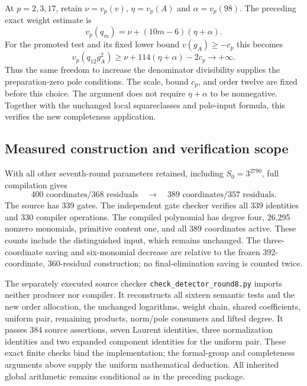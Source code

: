 At $p=2,3,17$, retain
$\nu=v_p(v)$, $\eta=v_p(A)$ and $\alpha=v_p(98)$. The preceding exact
weight estimate is
\[
 v_p(q_m)=\nu+(10m-6)(\eta+\alpha).
\]
For the promoted test and its fixed lower bound $v(g_A)\ge-c_p$ this
becomes
\[
 v_p(q_{12}g_A^2)\ge
 \nu+114(\eta+\alpha)-2c_p\longrightarrow+\infty.
\]
Thus the same freedom to increase the denominator divisibility supplies
the preparation-zero pole conditions. The scale, bound $c_p$, and order
twelve are fixed before this choice. The argument does not require
$\eta+\alpha$ to be nonnegative. Together with the unchanged local
squareclasses and pole-input formula, this verifies the new
completeness application.

\subsection{Measured construction and verification scope}

With all other seventh-round parameters retained, including
$S_0=3^{2790}$, full compilation gives
\[
 400\text{ coordinates}/368\text{ residuals}
 \quad\longrightarrow\quad
 \boxed{389\text{ coordinates}/357\text{ residuals}}.
\]
The source has 339 gates. The independent gate checker verifies all
339 identities and 330 compiler operations. The compiled polynomial
has degree four, 26,295 nonzero monomials, primitive content one, and
all 389 coordinates active. These counts include the distinguished
input, which remains unchanged. The three-coordinate saving and
six-monomial decrease are relative to the frozen 392-coordinate,
360-residual construction; no final-elimination saving is counted twice.

The separately executed source checker
\texttt{check\_detector\_round8.py} imports neither producer nor compiler.
It reconstructs all sixteen semantic tests and the new order allocation,
the unchanged logarithms, weight chain, shared coefficients, uniform
pair, remaining products, norm/pole consumers and lifted degree. It
passes 384 source assertions, seven Laurent identities, three
normalization identities and two expanded component identities for the
uniform pair. These exact finite checks bind the implementation;
the formal-group and completeness arguments above supply the uniform
mathematical deduction. All inherited global arithmetic remains
conditional as in the preceding package.
